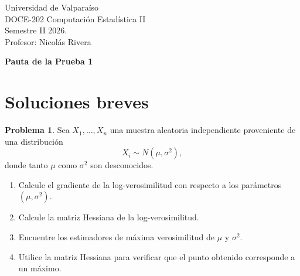 \documentclass[a4paper,12 pt]{article}
\theoremstyle{definition}
\newtheorem{problema}{Problema}
\begin{document}
	
	\begin{flushleft}
		\Large{ Universidad de Valpara\'iso \\
			DOCE-202 Computación Estadística II \\
			Semestre II 2026.\\
			Profesor: Nicolás Rivera
		}
	\end{flushleft}
	
	\begin{center}
		{\Large \bf Pauta de la Prueba 1}
	\end{center}
	
	
	
	\section*{Soluciones breves}

	
		\begin{problema}
		
		Sea \(X_1,\ldots,X_n\) una muestra aleatoria independiente proveniente de una distribución
		\[
		X_i \sim N(\mu,\sigma^2),
		\]
		donde tanto \(\mu\) como \(\sigma^2\) son desconocidos.
		
		\begin{enumerate}
						
			\item Calcule el gradiente de la log-verosimilitud con respecto a los parámetros \((\mu,\sigma^2)\).
			
			\item Calcule la matriz Hessiana de la log-verosimilitud.
			
			\item Encuentre los estimadores de máxima verosimilitud de \(\mu\) y \(\sigma^2\).
			
			\item Utilice la matriz Hessiana para verificar que el punto obtenido corresponde a un máximo.
		\end{enumerate}
		
	\end{problema}
\end{document}
